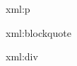\startxmlsetups xml:p
  \par
\stopxmlsetups

\startxmlsetups xml:blockquote
\stopxmlsetups

\startxmlsetups xml:div
  \stop
\stopxmlsetups
